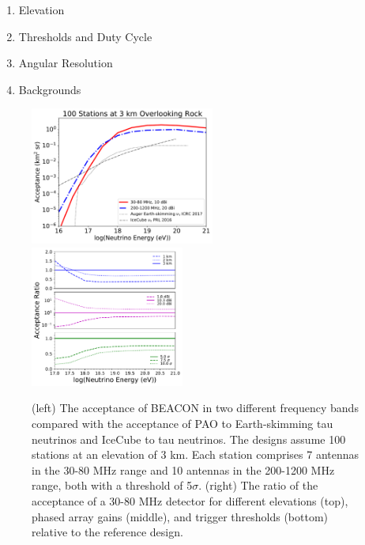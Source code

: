\documentclass[12pt]{article}
\begin{document}
\begin{enumerate}
\item Elevation
\item Thresholds and Duty Cycle
\item Angular Resolution
\item Backgrounds
\end{enumerate}

\begin{figure}[hbtp]
\begin{center}
\includegraphics[width=0.54\textwidth]{figures/acceptance_100stations_energyssampling}
\includegraphics[width=0.45\textwidth]{figures/acceptanceratio_100stations_energyssampling_study}
\caption{(left) The acceptance of BEACON in two different frequency bands compared with the acceptance of PAO to Earth-skimming tau neutrinos and IceCube to tau neutrinos. The designs assume 100 stations at an elevation of 3 km. Each station comprises 7 antennas in the 30-80 MHz range and 10 antennas in the 200-1200 MHz range, both with a threshold of 5$\sigma$. (right) The ratio of the acceptance of a 30-80 MHz detector for different elevations (top), phased array gains (middle), and trigger thresholds (bottom) relative to the reference design. }
\label{fig:acceptance}
\end{center}
\end{figure}
\end{document}
